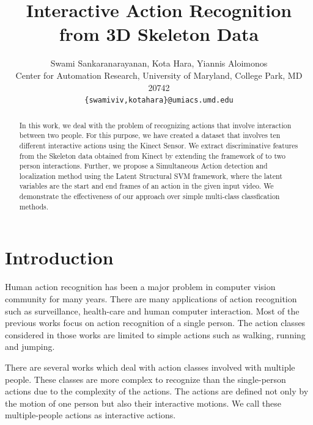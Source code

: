 \documentclass[10pt,twocolumn,letterpaper]{article}
\begin{document}
\title{Interactive Action Recognition from 3D Skeleton Data}

\author{Swami Sankaranarayanan, Kota Hara, Yiannis Aloimonos\\
Center for Automation Research, University of Maryland, College Park, MD 20742\\
{\tt\small \{swamiviv,kotahara\}@umiacs.umd.edu}
}


\maketitle

\begin{abstract}
In this work, we deal with the problem of recognizing actions that involve interaction between two people. For this purpose, we have created a dataset that involves ten different interactive actions using the Kinect Sensor. We extract discriminative features from the Skeleton data obtained from Kinect by extending the framework of \cite{Vemulapalli2013} to two person interactions. Further, we propose a Simultaneous Action detection and localization method using the Latent Structural SVM framework, where the latent variables are the start and end frames of an action in the given input video. We demonstrate the effectiveness of our approach over simple multi-class classfication methods.
   
\end{abstract}

\section{Introduction}
Human action recognition has been a major problem in computer vision community for many years. There are many applications of action recognition such as surveillance, health-care and human computer interaction. Most of the previous works focus on action recognition of a single person. The action classes considered in those works are limited to simple actions such as walking, running and jumping. 

There are several works which deal with action classes involved with multiple people. These classes are more complex to recognize than the single-person actions due to the complexity of the actions. The actions are defined not only by the motion of one person but also their interactive motions. We call these multiple-people actions as interactive actions.
\end{document}
